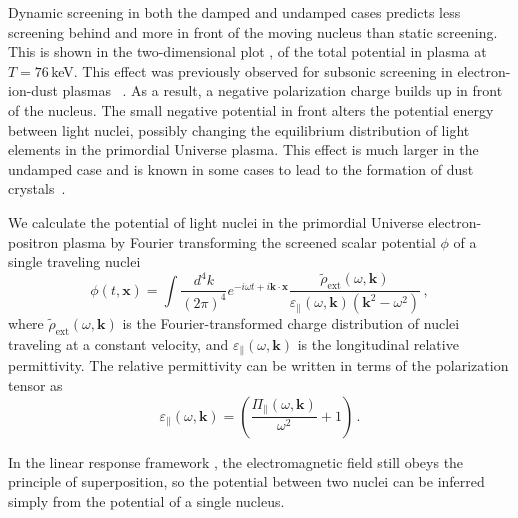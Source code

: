 Dynamic screening in both the damped and undamped cases predicts less screening behind and more in front of the moving nucleus than static screening. This is shown in the two-dimensional plot , of the total potential in plasma at $T=76\,$keV. This effect was previously observed for subsonic screening in electron-ion-dust plasmas ~\cite{Stenflo:1973,Shukla:2002ppcf,Lampe:2000pop}. As a result, a negative polarization charge builds up in front of the nucleus. The small negative potential in front alters the potential energy between light nuclei, possibly changing the equilibrium distribution of light elements in the primordial Universe plasma. This effect is much larger in the undamped case and is known in some cases to lead to the formation of dust crystals~\cite{Shukla:1996ccc}. 

We calculate the potential of light nuclei in the primordial Universe electron-positron plasma by Fourier transforming the screened scalar potential $\phi$ of a single traveling nuclei 
\begin{equation}\label{eq:potent}
 \phi(t,\boldsymbol{x}) = \int \frac{d^4k}{(2\pi)^4} e^{-i\omega t+ i\boldsymbol{k}\cdot\boldsymbol{x}} \frac{\widetilde{\rho}_\text{ext}(\omega,\boldsymbol{k})}{\varepsilon_\parallel(\omega,\boldsymbol{k})(\boldsymbol{k}^2-\omega^2) }\,,
\end{equation}
where $\widetilde{\rho}_{\text{ext}}(\omega,\boldsymbol{k})$ is the Fourier-transformed charge distribution of nuclei traveling at a constant velocity, and $\varepsilon_\parallel(\omega,\boldsymbol{k})$ is the longitudinal relative permittivity. The relative permittivity can be written in terms of the polarization tensor as
\begin{equation}\label{eq:epsilon}
 \varepsilon_\parallel(\omega,\boldsymbol{k})= \left(\frac{\Pi_{\parallel}(\omega,\boldsymbol{k})}{ \omega^2}+1\right)\,.
\end{equation}

In the linear response framework , the electromagnetic field still obeys the principle of superposition, so the potential between two nuclei can be inferred simply from the potential of a single nucleus. 

